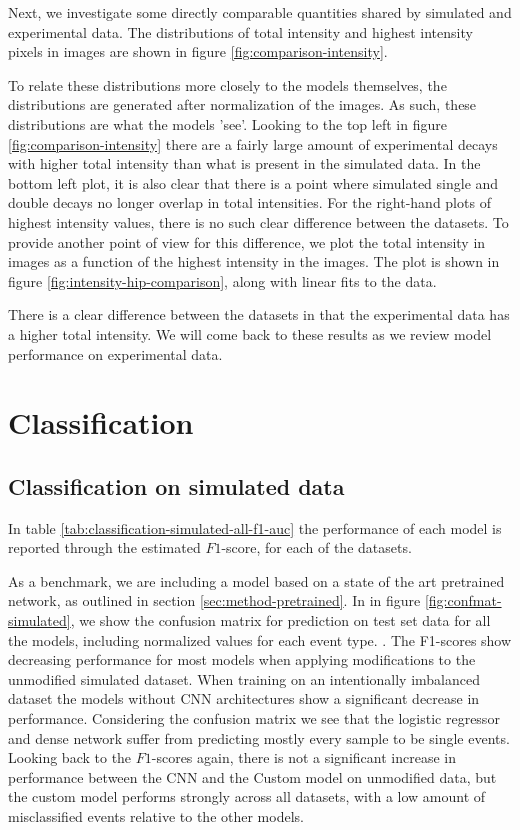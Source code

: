 \noindent Next, we investigate some directly comparable quantities shared by simulated and
experimental data. The distributions of total intensity and highest intensity pixels
in images are shown in figure \ref{fig:comparison-intensity}. 

\noindent To relate these distributions more closely to the models themselves, 
the distributions are generated after normalization of the
images. As such, these distributions are what the models 'see'. Looking to the top left
in figure \ref{fig:comparison-intensity} there are a fairly large amount of experimental
decays with higher total intensity than what is present in the simulated data. In the bottom
left plot, it is also clear that there is a point where simulated single and double decays no longer
overlap in total intensities. For the right-hand plots of highest intensity values, there is no such
clear difference between the datasets.
To provide another point of view for this difference, we plot the total intensity in images as
a function of the highest intensity in the images. 
The plot is shown in figure \ref{fig:intensity-hip-comparison}, along with linear fits to the
data.

\noindent There is a clear difference between the datasets in that the experimental data
has a higher total intensity. We will come back to these results as we review model
performance on experimental data.

\section{Classification}
\subsection{Classification on simulated data}
In table \ref{tab:classification-simulated-all-f1-auc} the performance of each model
is reported through the estimated $F1$-score, for each of the datasets. 

As a benchmark, we are including a model based on a state of the art pretrained 
network\cite{Simonyan2015}, as outlined in section \ref{sec:method-pretrained}. 
In in figure \ref{fig:confmat-simulated}, we show the confusion matrix for prediction
on test set data for all the models, including normalized values for each event type.
. The F1-scores show decreasing
performance for most models when applying modifications to the unmodified simulated dataset.
When training on an intentionally imbalanced
dataset the models without CNN architectures show a significant decrease in performance.
Considering the confusion matrix we see that the logistic regressor and dense network
suffer from predicting mostly every sample to be single events. Looking back to the
$F1$-scores again, there is not a significant increase in performance between the
CNN and the Custom model on unmodified data, but the custom model performs strongly
across all datasets, with a low amount of misclassified events relative to the other
models.

